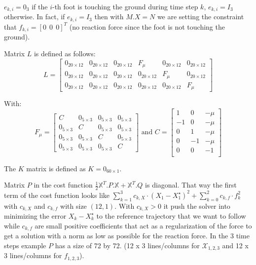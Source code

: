 \documentclass[a4paper,11pt]{article}
\begin{document}
$e_{k,i} = 0_3$ if the $i$-th foot is touching the ground during time step $k$, $e_{k,i} = I_3$ otherwise. In fact, if $e_{k,i} = I_3$ then with $M.X = N$ we are setting the constraint that $f_{k,i} = [0 ~~ 0 ~~ 0]^T$ (no reaction force since the foot is not touching the ground).

Matrix $L$ is defined as follows:
\begin{equation}
L = \begin{bmatrix} 
	0_{20\times12} & 0_{20\times12} & 0_{20\times12}  & F_\mu  & 0_{20\times12} & 0_{20\times12} \\
	0_{20\times12} & 0_{20\times12} & 0_{20\times12}  & 0_{20\times12} & F_\mu  & 0_{20\times12} \\
	0_{20\times12} & 0_{20\times12} & 0_{20\times12}  & 0_{20\times12} & 0_{20\times12} & F_\mu  \end{bmatrix}
\end{equation}

With:
\begin{equation}
F_\mu = \begin{bmatrix} 
	C  & 0_{5\times3} & 0_{5\times3} & 0_{5\times3} \\
	0_{5\times3} & C & 0_{5\times3} & 0_{5\times3} \\
	0_{5\times3}  & 0_{5\times3} & C & 0_{5\times3} \\
	0_{5\times3}  & 0_{5\times3} & 0_{5\times3} & C
\end{bmatrix} \text{ and } C = \begin{bmatrix} 
1  & 0 & -\mu \\
-1 & 0 & -\mu \\
0  & 1 & -\mu \\
0  & -1 & -\mu \\
0  & 0 & - 1 \\
\end{bmatrix}
\end{equation}

The $K$ matrix is defined as $K = 0_{60 \times 1}$.

Matrix $P$ in the cost function $\frac{1}{2}\mathbb{X}^T.P.\mathbb{X} + \mathbb{X}^T.Q$ is diagonal. That way the first term of the cost function looks like $\sum_{k=1}^{3} c_{k,X} \cdot (X_1 - X_1^\star)^2 + \sum_{k=0}^{2} c_{k,f} \cdot f_k^2$ with $c_{k,X}$ and $c_{k,f}$ with size $(12, 1)$. With $c_{k,X} > 0$ it push the solver into minimizing the error $X_k - X_k^\star$ to the reference trajectory that we want to follow while $c_{k,f}$ are small positive coefficients that act as a regularization of the force to get a solution with a norm as low as possible for the reaction force. In the 3 time steps example $P$ has a size of 72 by 72. (12 x 3 lines/columns for $\mathcal{X}_{1,2,3}$ and 12 x 3 lines/columns for $f_{1,2,3}$).
 
\end{document}
